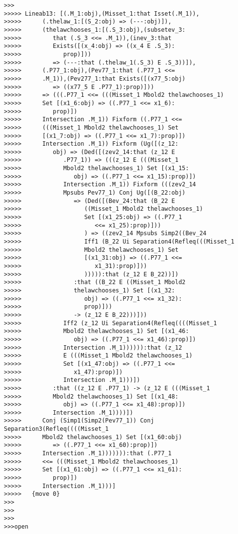 \documentclass[12pt]{article}
\begin{document}
\begin{verbatim}
>>>
>>>>> Lineab13: [(.M_1:obj),(Misset_1:that Isset(.M_1)),
>>>>>      (.thelaw_1:[(S_2:obj) => (---:obj)]),
>>>>>      (thelawchooses_1:[(.S_3:obj),(subsetev_3:
>>>>>         that (.S_3 <<= .M_1)),(inev_3:that
>>>>>         Exists([(x_4:obj) => ((x_4 E .S_3):
>>>>>            prop)]))
>>>>>         => (---:that (.thelaw_1(.S_3) E .S_3))]),
>>>>>      (.P77_1:obj),(Pev77_1:that (.P77_1 <<=
>>>>>      .M_1)),(Pev277_1:that Exists([(x77_5:obj)
>>>>>         => ((x77_5 E .P77_1):prop)]))
>>>>>      => (((.P77_1 <<= (((Misset_1 Mbold2 thelawchooses_1)
>>>>>      Set [(x1_6:obj) => ((.P77_1 <<= x1_6):
>>>>>         prop)])
>>>>>      Intersection .M_1)) Fixform ((.P77_1 <<=
>>>>>      (((Misset_1 Mbold2 thelawchooses_1) Set
>>>>>      [(x1_7:obj) => ((.P77_1 <<= x1_7):prop)])
>>>>>      Intersection .M_1)) Fixform (Ug([(z_12:
>>>>>         obj) => (Ded([(zev2_14:that (z_12 E
>>>>>            .P77_1)) => (((z_12 E (((Misset_1
>>>>>            Mbold2 thelawchooses_1) Set [(x1_15:
>>>>>               obj) => ((.P77_1 <<= x1_15):prop)])
>>>>>            Intersection .M_1)) Fixform (((zev2_14
>>>>>            Mpsubs Pev77_1) Conj Ug([(B_22:obj)
>>>>>               => (Ded([(Bev_24:that (B_22 E
>>>>>                  ((Misset_1 Mbold2 thelawchooses_1)
>>>>>                  Set [(x1_25:obj) => ((.P77_1
>>>>>                     <<= x1_25):prop)]))
>>>>>                  ) => ((zev2_14 Mpsubs Simp2((Bev_24
>>>>>                  Iff1 (B_22 Ui Separation4(Refleq(((Misset_1
>>>>>                  Mbold2 thelawchooses_1) Set
>>>>>                  [(x1_31:obj) => ((.P77_1 <<=
>>>>>                     x1_31):prop)]))
>>>>>                  ))))):that (z_12 E B_22))])
>>>>>               :that ((B_22 E ((Misset_1 Mbold2
>>>>>               thelawchooses_1) Set [(x1_32:
>>>>>                  obj) => ((.P77_1 <<= x1_32):
>>>>>                  prop)]))
>>>>>               -> (z_12 E B_22)))]))
>>>>>            Iff2 (z_12 Ui Separation4(Refleq((((Misset_1
>>>>>            Mbold2 thelawchooses_1) Set [(x1_46:
>>>>>               obj) => ((.P77_1 <<= x1_46):prop)])
>>>>>            Intersection .M_1)))))):that (z_12
>>>>>            E (((Misset_1 Mbold2 thelawchooses_1)
>>>>>            Set [(x1_47:obj) => ((.P77_1 <<=
>>>>>               x1_47):prop)])
>>>>>            Intersection .M_1)))])
>>>>>         :that ((z_12 E .P77_1) -> (z_12 E (((Misset_1
>>>>>         Mbold2 thelawchooses_1) Set [(x1_48:
>>>>>            obj) => ((.P77_1 <<= x1_48):prop)])
>>>>>         Intersection .M_1))))])
>>>>>      Conj (Simp1(Simp2(Pev77_1)) Conj Separation3(Refleq((((Misset_1
>>>>>      Mbold2 thelawchooses_1) Set [(x1_60:obj)
>>>>>         => ((.P77_1 <<= x1_60):prop)])
>>>>>      Intersection .M_1))))))):that (.P77_1
>>>>>      <<= (((Misset_1 Mbold2 thelawchooses_1)
>>>>>      Set [(x1_61:obj) => ((.P77_1 <<= x1_61):
>>>>>         prop)])
>>>>>      Intersection .M_1)))]
>>>>>   {move 0}
>>>
>>>
>>>
>>>open


\end{verbatim}
\end{document}
